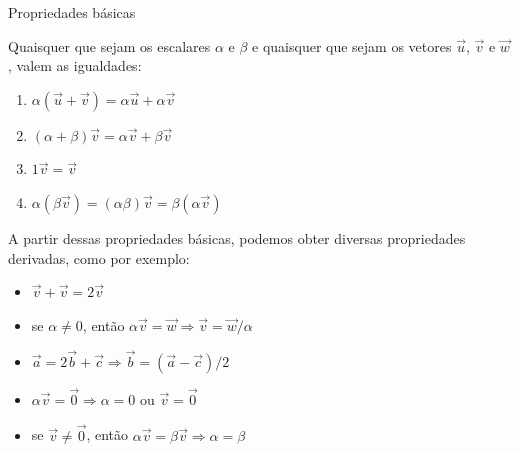 \begin{frame}{Propriedades básicas}

    Quaisquer que sejam os escalares \(\alpha\) e \(\beta\) e quaisquer que sejam os vetores \(\vec{u}\), \(\vec{v}\) e \(\vec{w}\),
    valem as igualdades:

    \begin{enumerate}
        \item \(\alpha(\vec{u}+\vec{v})=\alpha\vec{u}+\alpha\vec{v}\)
        \item \((\alpha+\beta)\vec{v}=\alpha\vec{v}+\beta\vec{v}\)
        \item \(1\vec{v}=\vec{v}\)
        \item \(\alpha(\beta\vec{v})=(\alpha\beta)\vec{v}=\beta(\alpha\vec{v})\)
    \end{enumerate}

    \pause
    A partir dessas propriedades básicas, podemos obter diversas propriedades derivadas, como por exemplo:
    \begin{itemize}
        \item \( \vec{v}+\vec{v}=2\vec{v}\)
        \item se \(\alpha \neq 0\), então \(\alpha\vec{v}=\vec{w} \Rightarrow \vec{v}=\vec{w}/\alpha\)
        \item \(\vec{a}=2\vec{b}+\vec{c} \Rightarrow \vec{b}=(\vec{a}-\vec{c})/2\)
        \item \(\alpha\vec{v}=\vec{0} \Rightarrow \alpha = 0 \text{ ou } \vec{v}=\vec{0}\)
        \item se \(\vec{v} \neq \vec{0}\), então \(\alpha\vec{v}=\beta\vec{v} \Rightarrow \alpha=\beta\)
    \end{itemize}
\end{frame}

